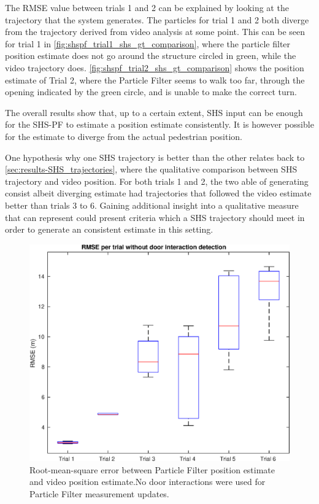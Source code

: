 The RMSE value between trials 1 and 2 can be explained by looking at the trajectory that the system generates. The particles for trial 1 and 2 both diverge from the trajectory derived from video analysis at some point. This can be seen for trial 1 in  \cref{fig:shspf_trial1_shs_gt_comparison}, where the particle filter position estimate does not go around the structure circled in green, while the video trajectory does. \cref{fig:shspf_trial2_shs_gt_comparison} shows the position estimate of Trial 2, where the Particle Filter seems to walk too far, through the opening indicated by the green circle,  and is unable to make the correct turn. \par 

The overall results show that, up to a certain extent, SHS input can be enough for the SHS-PF to estimate a position estimate consistently. It is however possible for the estimate to diverge from the actual pedestrian position.

One hypothesis why one SHS trajectory is better than the other relates back to \cref{sec:results-SHS_trajectories}, where the qualitative comparison between SHS trajectory and video position. For both trials 1 and 2, the two able of generating consist albeit diverging estimate had trajectories that followed the video estimate better than trials 3 to 6. Gaining additional insight into a qualitative measure that can represent could present criteria which a SHS trajectory should meet in order to generate an consistent estimate in this setting. 

\begin{figure}[H]
	\centering
	\includegraphics[width=0.7\linewidth]{images/20201202_2216_last_image_for_thesis_1}
	\caption{Root-mean-square error between Particle Filter position estimate and video position estimate.No door interactions were used for Particle Filter measurement updates.}
	\label{fig:placeholder}
\end{figure}



